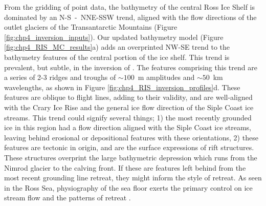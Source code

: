 From the gridding of point data, the bathymetry of the central Ross Ice Shelf is dominated by an N-S~-~NNE-SSW trend, aligned with the flow directions of the outlet glaciers of the Transantarctic Mountains (Figure \ref{fig:chp4_inversion_inputs}). Our updated bathymetry model (Figure \ref{fig:chp4_RIS_MC_results}a) adds an overprinted NW-SE trend to the bathymetry features of the central portion of the ice shelf. This trend is prevalent, but subtle, in the inversion of \citet{tintoross2019}. The features comprising this trend are a series of 2-3 ridges and troughs of $\sim100$~m amplitudes and $\sim50$~km wavelengths, as shown in Figure \ref{fig:chp4_RIS_inversion_profiles}d. These features are oblique to flight lines, adding to their validity, and are well-aligned with the Crary Ice Rise and the general ice flow direction of the Siple Coast ice streams. This trend could signify several things; 1) the most recently grounded ice in this region had a flow direction aligned with the Siple Coast ice streams, leaving behind erosional or depositional features with these orientations, 2) these features are tectonic in origin, and are the surface expressions of rift structures. These structures overprint the large bathymetric depression which runs from the Nimrod glacier to the calving front. If these are features left behind from the most recent grounding line retreat, they might inform the style of retreat. As seen in the Ross Sea, physiography of the sea floor exerts the primary control on ice stream flow and the patterns of retreat \citep{halberstadticesheet2016}. 


